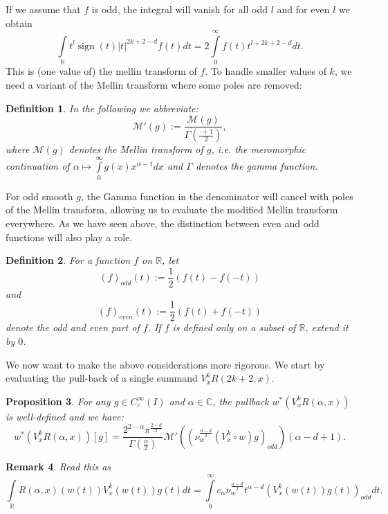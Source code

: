 \documentclass[11pt]{article}
\def\C{{\mathbb{C}}}
\def\R{{\mathbb{R}}}
\def\intR{\int\limits_\R}
\def\intP{\int\limits_0^\infty}
\def\M{\mathcal{M}}
\newtheorem{df}{Definition}[section]
\newtheorem{prop}[df]{Proposition}
\newtheorem{rem}[df]{Remark}
\DeclareMathOperator{\sign}{sign}
\begin{document}
If we assume that $f$ is odd, the integral will vanish for all odd $l$ and for even $l$ we obtain
\[\int\limits_\R t^l  \sign(t)|t|^{2k+2-d}f(t)dt=2\intP f(t)t^{l+2k+2-d}dt.\]
This is (one value of) the mellin transform of $f$. To handle smaller values of $k$, we need a variant of the Mellin transform where some poles are removed:
\begin{df}
	\label{dfMprime}
	In the following we abbreviate:
	\[\M'(g):=\frac{\M(g)}{\Gamma(\frac{\cdot+1}{2})},\]
	where $\M(g)$ denotes the Mellin transform of $g$, i.e. the meromorphic continuation of 
	$\alpha \mapsto \intP g(x)x^{\alpha-1}dx$ and $\Gamma$ denotes the gamma function.
\end{df}
For odd smooth $g$, the Gamma function in the denominator will cancel with poles of the Mellin transform, allowing us to evaluate the modified Mellin transform everywhere. 
As we have seen above, the distinction between even and odd functions will also play a role.
\begin{df}
	\label{evenodd}
	For a function $f$ on $\R$, let 
	\[(f)_{odd}(t):=\frac{1}{2}(f(t)-f(-t))\]
	and
	\[(f)_{even}(t):=\frac{1}{2}(f(t)+f(-t))\]
	denote the odd and even part of $f$. If $f$ is defined only on a subset of $\R$, extend it by $0$.
\end{df}
We now want to make the above considerations more rigorous.
We start by evaluating the pull-back of a single summand $V_x^kR(2k+2,x)$. 
\begin{prop}
	\label{WRint}
	For any $g\in C_c^\infty(I)$ and $\alpha\in \C$, the pullback $w^*({V^k_x}R(\alpha,x))$ is well-defined and we have:
	\[w^*({V^k_x}R(\alpha,x))[g]=\frac{2^{2-\alpha}\pi^\frac{2-d}{2}}{\Gamma(\frac{\alpha}{2})}\M'\left(\left(\nu_w^\frac{\alpha-d}{2}({V^k_x}\circ w)g\right)_{odd}\right)({\alpha-d+1}).\]
\end{prop}
\begin{rem}
	Read this as
	\[\intR R(\alpha,x)(w(t)){V^k_x}(w(t))g(t)dt=\intP c_\alpha \nu_w^\frac{\alpha-d}{2} t^{\alpha-d} ({V^k_x}(w(t))g(t))_{odd} dt.\]
\end{rem}
\end{document}
